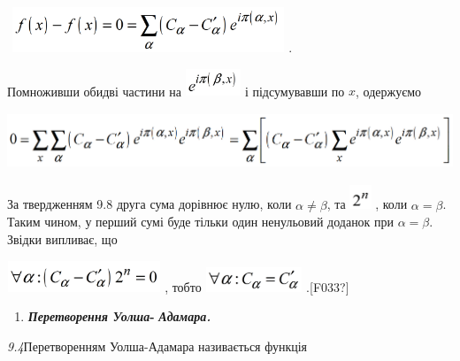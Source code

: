 {{{$$ \includegraphics[width=3.2173in,height=0.5307in]{crypt-img/crypt-img161.png} .
\par}

Помноживши  обидві частини на 
\includegraphics[width=0.6528in,height=0.3193in]{crypt-img/crypt-img162.png}  і
 підсумувавши  по $x$, одержуємо 

{\centering 
\includegraphics[width=5.5811in,height=0.6563in]{crypt-img/crypt-img163.png}
\par}

За твердженням 9.8 друга сума дорівнює нулю, коли  $\alpha \neq \beta $,  та  
\includegraphics[width=0.2516in,height=0.2957in]{crypt-img/crypt-img164.png} ,
коли  $\alpha =\beta $. Таким чином, у перший сумі буде тільки один
ненульовий доданок при  $\alpha =\beta $. Звідки випливає, що

 \includegraphics[width=1.8071in,height=0.3661in]{crypt-img/crypt-img165.png} ,
тобто  
\includegraphics[width=1.1366in,height=0.2866in]{crypt-img/crypt-img166.png}
.\textlatin{[F033?]}


\bigskip

\liststyleWWviiiNumlii
\setcounter{saveenum}{\value{enumi}}
\begin{enumerate}
\setcounter{enumi}{\value{saveenum}}
\item \textbf{\textit{Перетворення  Уолша}}\textbf{$$-}
\textbf{\textit{Адамара}}\textbf{\textit{.}}
\end{enumerate}
 \begin{definition}
\textit{9.}\textit{4}Перетворенням Уолша-Адамара
називається функція 


\end{definition}}}
